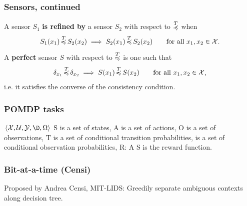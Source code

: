 \documentclass{beamer}
\def\ang#1{\left\langle#1\right\rangle}
\def\X{\mathcal{X}}
\def\Y{\mathcal{Y}}
\def\U{\mathcal{U}}
\def\less#1{\overset{#1}{\rule{0pt}{4pt}\smash{\preccurlyeq}}}
\begin{document}

\begin{frame}
\frametitle{Sensors, continued}
\begin{definition}
 A sensor $S_1$ \textbf{is refined by} a sensor $S_2$ with respect to $\less{T}$ when
 $$S_1(x_1)\,\less{T}\,S_2(x_2) \implies S_2(x_1)\,\less{T}\,S_2(x_2)\qquad\text{for all $x_1, x_2\in\X$.}$$
 A \textbf{perfect} sensor $S$ with respect to $\less{T}$ is one such that
 $$\delta_{x_1}\,\less{T}\,\delta_{x_2} \implies S(x_1)\,\less{T}\,S(x_2)\qquad\text{for all $x_1, x_2\in\X$,}$$
 i.e. it satisfies the converse of the consistency condition.
\end{definition}
\end{frame}


\begin{frame}
\frametitle{POMDP tasks}
$\ang{\X, \U, \Y, \D, \Omega}$
S is a set of states,
A is a set of actions,
O is a set of observations,
T is a set of conditional transition probabilities,
\Omega is a set of conditional observation probabilities,
R: A \times S \to {} is the reward function.
\end{frame}
\fi

\begin{frame}
\frametitle{Bit-at-a-time (Censi)}
Proposed by Andrea Censi, MIT-LIDS: Greedily separate ambiguous contexts along decision tree.
\begin{figure}
\centering
{}$\quad\phantom{\to}\quad$
\end{figure}
\end{frame}
 
\end{document}
